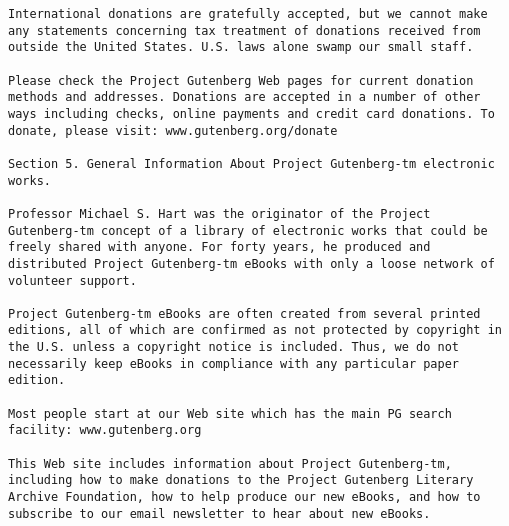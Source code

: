 \documentclass[oneside]{book}
\begin{document}
\begin{verbatim}
International donations are gratefully accepted, but we cannot make
any statements concerning tax treatment of donations received from
outside the United States. U.S. laws alone swamp our small staff.

Please check the Project Gutenberg Web pages for current donation
methods and addresses. Donations are accepted in a number of other
ways including checks, online payments and credit card donations. To
donate, please visit: www.gutenberg.org/donate

Section 5. General Information About Project Gutenberg-tm electronic works.

Professor Michael S. Hart was the originator of the Project
Gutenberg-tm concept of a library of electronic works that could be
freely shared with anyone. For forty years, he produced and
distributed Project Gutenberg-tm eBooks with only a loose network of
volunteer support.

Project Gutenberg-tm eBooks are often created from several printed
editions, all of which are confirmed as not protected by copyright in
the U.S. unless a copyright notice is included. Thus, we do not
necessarily keep eBooks in compliance with any particular paper
edition.

Most people start at our Web site which has the main PG search
facility: www.gutenberg.org

This Web site includes information about Project Gutenberg-tm,
including how to make donations to the Project Gutenberg Literary
Archive Foundation, how to help produce our new eBooks, and how to
subscribe to our email newsletter to hear about new eBooks.
\end{verbatim}

\end{document}
